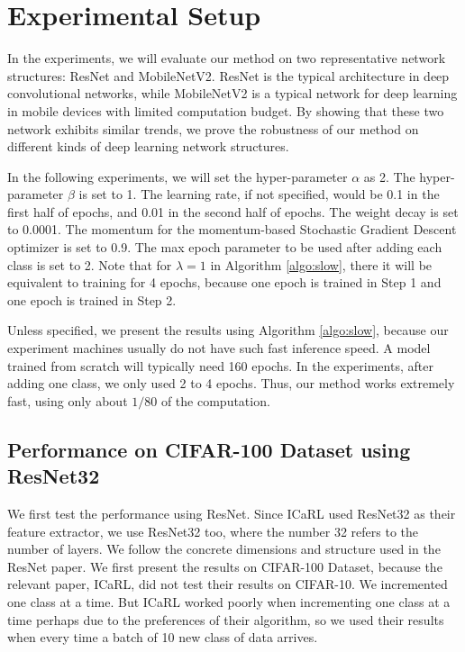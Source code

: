 \section{Experimental Setup}

In the experiments, we will evaluate our method on two representative network structures: ResNet and MobileNetV2. ResNet is the typical architecture in deep convolutional networks, while MobileNetV2 is a typical network for deep learning in mobile devices with limited computation budget. By showing that these two network exhibits similar trends, we prove the robustness of our method on different kinds of deep learning network structures. 

In the following experiments, we will set the hyper-parameter $\alpha$ as 2. The hyper-parameter $\beta$ is set to 1. The learning rate, if not specified, would be 0.1 in the first half of epochs, and 0.01 in the second half of epochs. The weight decay is set to 0.0001. The momentum for the momentum-based Stochastic Gradient Descent optimizer is set to 0.9. The max epoch parameter to be used after adding each class is set to 2. Note that for $\lambda=1$ in Algorithm \ref{algo:slow}, there it will be equivalent to training for 4 epochs, because one epoch is trained in Step 1 and one epoch is trained in Step 2.

Unless specified, we present the results using Algorithm \ref{algo:slow}, because our experiment machines usually do not have such fast inference speed. A model trained from scratch will typically need 160 epochs. In the experiments, after adding one class, we only used 2 to 4 epochs. Thus, our method works extremely fast, using only about $1/80$ of the computation.

\subsection{Performance on CIFAR-100 Dataset using ResNet32}

We first test the performance using ResNet. Since ICaRL used ResNet32 as their feature extractor, we use ResNet32 too, where the number 32 refers to the number of layers. We follow the concrete dimensions and structure used in the ResNet paper\cite{he2016deep}. We first present the results on CIFAR-100 Dataset, because the relevant paper, ICaRL, did not test their results on CIFAR-10. We incremented one class at a time. But ICaRL worked poorly when incrementing one class at a time perhaps due to the preferences of their algorithm, so we used their results when every time a batch of 10 new class of data arrives. 

